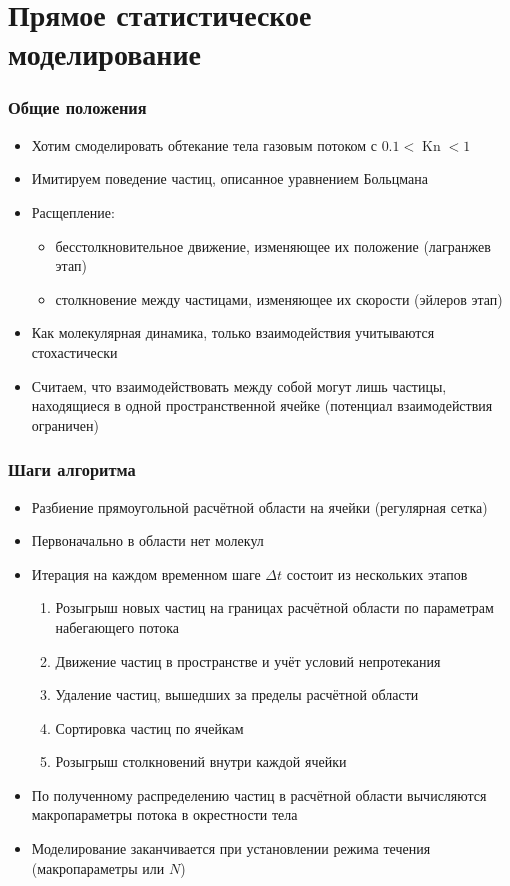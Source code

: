 \documentclass[onlymath]{beamer}
\DeclareMathOperator\Kn{Kn}
\begin{document}
\section{Прямое статистическое моделирование}
\begin{frame}
  \frametitle{Общие положения}
  \begin{itemize}
  \item Хотим смоделировать обтекание тела газовым потоком с $0.1 <
    \Kn < 1$
  \item Имитируем поведение частиц, описанное уравнением Больцмана
  \item Расщепление:
    \begin{itemize}
      \item бесстолкновительное движение, изменяющее их положение (лагранжев этап)
      \item столкновение между частицами, изменяющее их скорости (эйлеров этап)
    \end{itemize}
  \item Как молекулярная динамика, только взаимодействия учитываются
    стохастически
  \item Считаем, что взаимодействовать между собой могут лишь частицы,
    находящиеся в одной пространственной ячейке (потенциал
    взаимодействия ограничен)
  \end{itemize}
\end{frame}

\begin{frame}
  \frametitle{Шаги алгоритма}
  \begin{itemize}
  \item Разбиение прямоугольной расчётной области на ячейки (регулярная
    сетка)
  \item Первоначально в области нет молекул
  \item Итерация на каждом временном шаге $\Delta t$ состоит из
    нескольких этапов
    \begin{enumerate}
    \item Розыгрыш новых частиц на границах расчётной области по
      параметрам набегающего потока
    \item Движение частиц в пространстве и учёт условий непротекания
    \item Удаление частиц, вышедших за пределы расчётной области
    \item Сортировка частиц по ячейкам
    \item Розыгрыш столкновений внутри каждой ячейки
    \end{enumerate}
  \item По полученному распределению частиц в расчётной области
    вычисляются макропараметры потока в окрестности тела
  \item Моделирование заканчивается при установлении режима течения
    (макропараметры или $N$)
  \end{itemize}
\end{frame}
\end{document}
